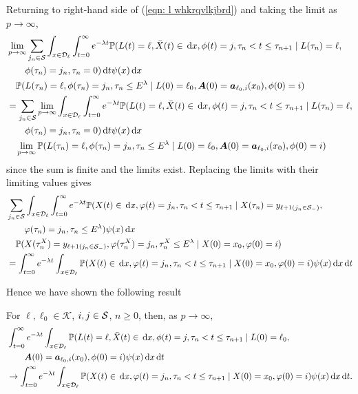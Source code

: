 Returning to right-hand side of (\ref{eqn: l whkrqvlkjbrd}) and taking the limit as \(p\to\infty\), 
\begin{align}
	&\lim_{p\to\infty} \sum_{j_n\in\mathcal S}
	\int_{x\in\mathcal{D}_\ell} \int_{t=0}^\infty e^{-\lambda t} \mathbb P(L(t) = \ell, \bar X(t) \in \, \mathrm{d} x, \phi(t) = j, 
	\tau_n<t \leq \tau_{n+1} \mid L(\tau_n) = \ell, \nonumber 
	 \\&\qquad{}\phi(\tau_n) = j_n, \tau_{n}= 0)\, \mathrm{d} t \psi(x)\, \mathrm{d} x \nonumber
	 \\&\quad \mathbb P(L(\tau_n) = \ell, \phi(\tau_n) = j_n, \tau_{n}\leq E^\lambda 
	 \mid L(0)=\ell_0, \boldsymbol A(0)=\boldsymbol  a_{\ell_0,i}(x_0), \phi(0)=i)\nonumber
	 \\&= \sum_{j_n\in\mathcal S}
	\lim_{p\to\infty} \int_{x\in\mathcal{D}_\ell} \int_{t=0}^\infty e^{-\lambda t}  \mathbb P(L(t) = \ell, \bar X(t) \in \, \mathrm{d} x, \phi(t) = j, 
	\tau_n<t \leq \tau_{n+1} \mid L(\tau_n) = \ell, \nonumber 
	 \\&\qquad{}\phi(\tau_n) = j_n, \tau_{n}= 0)\, \mathrm{d} t \psi(x)\, \mathrm{d} x \nonumber
	 \\&\quad{} \lim_{p\to\infty} \mathbb P(L(\tau_n) = \ell, \phi(\tau_n) = j_n, \tau_{n}\leq E^\lambda 
	 \mid L(0)=\ell_0, \boldsymbol A(0)=\boldsymbol  a_{\ell_0,i}(x_0), \phi(0)=i)\nonumber
\end{align}
since the sum is finite and the limits exist. Replacing the limits with their limiting values gives 
\begin{align}
	 &\sum_{j_n\in\mathcal S}\int_{x\in\mathcal{D}_\ell} \int_{t=0}^\infty e^{-\lambda t} \mathbb P(X(t)\in\, \mathrm{d} x, \varphi(t)=j_n, \tau_n < t \leq \tau_{n+1} \mid X(\tau_n) = y_{\ell+1(j_n\in\mathcal S_-)}, \nonumber 
	\\&\qquad{} \varphi(\tau_n)=j_n, \tau_n\leq E^\lambda ) \psi(x)\, \mathrm{d} x\nonumber
	\\&\quad{}\mathbb P(X(\tau_n^X) = y_{\ell+1(j_{n}\in\mathcal S_-)}, 
		\varphi(\tau_n^X) = j_n, \tau_{n}^X\leq E^\lambda
		\mid X(0)=x_0, \varphi(0)=i)\nonumber
	\\&= \int_{t=0}^\infty e^{-\lambda t}  \int_{x\in\mathcal{D}_\ell}\mathbb P(X(t)\in\, \mathrm{d} x, \varphi(t)=j_n, \tau_n < t \leq \tau_{n+1} 
	\mid X(0)=x_0, \varphi(0)=i)\psi(x)\, \mathrm{d} x\, \mathrm{d} t
\end{align}

Hence we have shown the following result 
\begin{lem}\label{lem: LAkAKFnvnb mav h}
	For \(\ell,\ell_0\in\mathcal K\), \(i,j\in\mathcal{S}\), \(n\geq 0\), then, as \(p\to\infty\), 
	\begin{align}
		&\int_{t=0}^\infty e^{-\lambda t}\int_{x\in\mathcal{D}_\ell}\mathbb P(L(t) = \ell, \bar X(t)\in\, \mathrm{d} x, \phi(t) = j, \tau_{n}< t\leq\tau_{n+1} \mid L(0)=\ell_0,  \nonumber 
		\\&\qquad \boldsymbol A(0)=\boldsymbol a_{\ell_0,i}(x_0), \phi(0)=i)\psi(x)\, \mathrm{d} x\, \mathrm{d} t \nonumber
		\\&\to\int_{t=0}^\infty e^{-\lambda t}  \int_{x\in\mathcal{D}_\ell}\mathbb P(X(t)\in\, \mathrm{d} x, \varphi(t)=j_n, \tau_n < t \leq \tau_{n+1} 
		\mid X(0)=x_0, \varphi(0)=i)\psi(x)\, \mathrm{d} x\, \mathrm{d} t.
	\end{align}
\end{lem}


